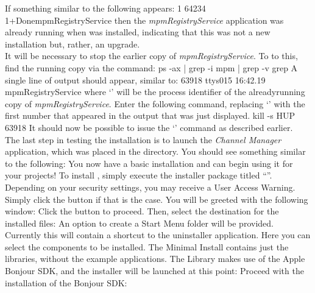 If something similar to the following appears:
\outputBegin{}
\openSq{}1\closeSq{} 64234\\
\openSq{}1\closeSq{}+\hspace*{1em}Done\hspace*{8em}mpmRegistryService
\outputEnd{}
then the \emph{mpmRegistryService} application was already running when \mplusm{} was
installed, indicating that this was not a new installation but, rather, an upgrade.\\

It will be necessary to stop the earlier copy of \emph{mpmRegistryService}.
To to this, find the running copy via the command:
\outputBegin{}
ps -ax | grep -i mpm | grep -v grep
\outputEnd{}
A single line of output should appear, similar to:
\outputBegin{}
63918 ttys015   16:42.19 mpmRegistryService
\outputEnd{}
where `' will be the process identifier of the already\longDash{}running
copy of \emph{mpmRegistryService}.
Enter the following command, replacing `' with the first number that
appeared in the output that was just displayed.
\outputBegin{}
kill -s HUP 63918
\outputEnd{}
It should now be possible to issue the `' command as
described earlier.\\

The last step in testing the \mplusm{} installation is to launch the
\emph{Channel Manager} application, which was placed in the 
directory.
You should see something similar to the following:
You now have a basic \mplusm{} installation and can begin using it for your projects!
\tertiaryEnd{}
\secondaryEnd{}
\newpage
{}
To install \mplusm, simply execute the installer package titled
``''.
Depending on your security settings, you may receive a User Access Warning.
Simply click the  button if that is the case.
You will be greeted with the following window:
Click the  button to proceed.
\newpage
Then, select the destination for the installed files:
An option to create a Start Menu folder will be provided.
Currently this will contain a shortcut to the uninstaller application.
\newpage
Here you can select the components to be installed.
The Minimal Install contains just the libraries, without the example applications.
The \mplusm{} Library makes use of the Apple Bonjour SDK, and the installer will be
launched at this point:
\newpage
Proceed with the installation of the Bonjour SDK:


